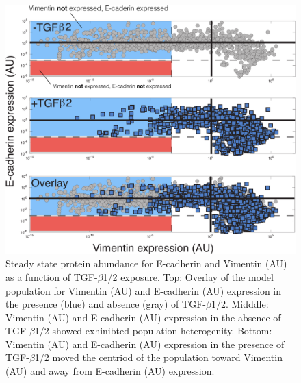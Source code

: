 \documentclass[12pt]{article}
\begin{document}
\begin{figure}
\includegraphics [width=1.0\linewidth] {./figs/Fig-9-Supplemental-RawExpression_v2.pdf}
\caption{Steady state protein abundance for E-cadherin and Vimentin (AU) as a function of TGF-$\beta$1/2 exposure.
Top: Overlay of the model population for Vimentin (AU) and E-cadherin (AU) expression in the presence (blue) and absence (gray) of TGF-$\beta$1/2.
Midddle: Vimentin (AU) and E-cadherin (AU) expression in the absence of TGF-$\beta$1/2 showed exhinibted population heterogenity.
Bottom: Vimentin (AU) and E-cadherin (AU) expression in the presence of TGF-$\beta$1/2 moved the centriod of the population toward Vimentin (AU) and away from E-cadherin (AU) expression.}\label{fig:S9}
\end{figure}


\end{document}
